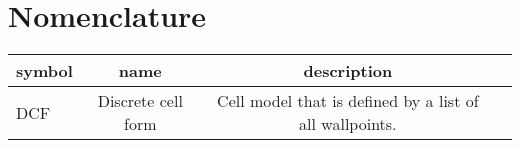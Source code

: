 \section*{Nomenclature}

\begin{table}[h]
    \label{tab:example}
    \centering
    \begin{tabular}{lccp{5cm}}
    \toprule
    \textbf{symbol} & \textbf{name} & \multicolumn{1}{c}{\textbf{description}}\\ 
    \midrule
    DCF & Discrete cell form & Cell model that is defined by a list of all wallpoints. \\
    \bottomrule
    \end{tabular}
 \end{table}